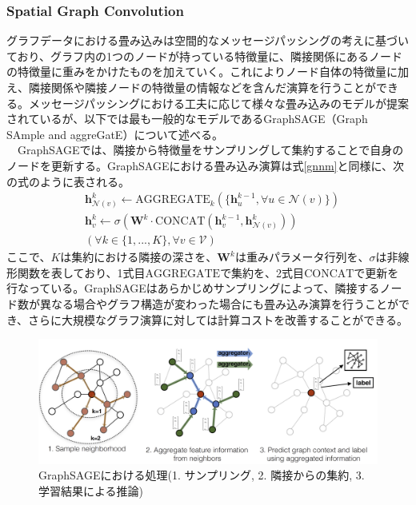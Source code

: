 \subsubsection{Spatial Graph Convolution}
グラフデータにおける畳み込みは空間的なメッセージパッシングの考えに基づいており、グラフ内の1つのノードが持っている特徴量に、隣接関係にあるノードの特徴量に重みをかけたものを加えていく。これによりノード自体の特徴量に加え、隣接関係や隣接ノードの特徴量の情報などを含んだ演算を行うことができる。メッセージパッシングにおける工夫に応じて様々な畳み込みのモデルが提案されているが、以下では最も一般的なモデルであるGraphSAGE（Graph SAmple and aggreGatE）\cite{graphsage}について述べる。\\
　GraphSAGEでは、隣接から特徴量をサンプリングして集約することで自身のノードを更新する。GraphSAGEにおける畳み込み演算は式\ref{gnnm}と同様に、次の式のように表される。\\
\begin{align}
&\bm{h}_{\mathcal{N}(v)}^k \leftarrow \mathrm{AGGREGATE}_k(\{ \bm{h}_u^{k-1}, \forall u \in \mathcal{N}(v) \})\\
&\bm{h}_v^k \leftarrow \sigma (\bm{W}^k \cdot \mathrm{CONCAT}(\bm{h}_v^{k-1}, \bm{h}_{\mathcal{N}(v)}^k))\\
&  (\forall k \in \{1, ..., K\}, \forall v \in \mathcal{V}) \nonumber
\end{align}
ここで、$K$は集約における隣接の深さを、$\bm{W}^k$は重みパラメータ行列を、$\sigma$は非線形関数を表しており、1式目$\mathrm{AGGREGATE}$で集約を、2式目$\mathrm{CONCAT}$で更新を行なっている。GraphSAGEはあらかじめサンプリングによって、隣接するノード数が異なる場合やグラフ構造が変わった場合にも畳み込み演算を行うことができ、さらに大規模なグラフ演算に対しては計算コストを改善することができる。
\begin{figure}[H]
	\begin{center}
 \includegraphics[keepaspectratio, scale=0.3]
 	{Figure/Deeplearning/sage.png}
 		\caption{GraphSAGEにおける処理(1. サンプリング, 2. 隣接からの集約, 3. 学習結果による推論)}
 		\label{sage}
	\end{center}
\end{figure}
